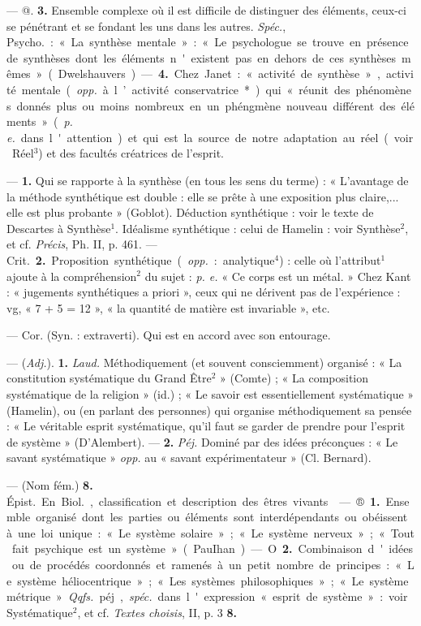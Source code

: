 \begin{itemize}[leftmargin=1cm, label=, itemsep=1pt]
— @. {\bf 3.} Ensemble complexe où il
est difficile de distinguer des éléments, ceux-ci se pénétrant et se
fondant les uns dans les autres.
{\it Spéc.}, \si{Psycho.} : « La synthèse mentale » : « Le psychologue se trouve
en présence de synthèses dont les
éléments n'existent pas en dehors
de ces synthèses mêmes. » (Dwelshauvers). — {\bf 4.} Chez Janet : « activité
de synthèse », activité mentale
({\it opp.} à l’activité conservatrice*) qui
« réunit des phénomènes donnés
plus ou moins nombreux en un phéngmène nouveau différent des éléments » ({\it p. e.} dans l'attention) et qui
est la source de notre adaptation au
réel (voir Réel$^3$) et des facultés créatrices de l'esprit.

 — {\bf 1.} Qui se rapporte à
la synthèse (en tous les sens du
terme) : « L'avantage de la méthode
synthétique est double : elle se
prête à une exposition plus claire,...
elle est plus probante » (Goblot).
Déduction synthétique : voir le texte
de Descartes à Synthèse$^1$. Idéalisme
synthétique : celui de Hamelin : voir
Synthèse$^2$, et cf. {\it Précis}, Ph. II,
p. 461.
— \si{Crit.} {\bf 2.} Proposition synthétique ({\it opp.} : analytique$^4$) : celle où
l’attribut$^1$ ajoute à la compréhension$^2$ du sujet : {\it p. e.} « Ce corps est un
métal. » Chez Kant : « jugements
synthétiques a priori », ceux qui ne
dérivent pas de l'expérience : vg,
« 7 + 5 = 12 », « la quantité de
matière est invariable », etc.

 — Cor. (Syn. : extraverti). Qui
est en accord avec son entourage.

 — ({\it Adj.}). {\bf 1.} {\it Laud.} Méthodiquement (et souvent consciemment) organisé : « La constitution
systématique du Grand Être$^2$ »
(Comte) ; « La composition systématique de la religion » (id.) ; « Le
savoir est essentiellement systématique » (Hamelin), ou (en parlant
des personnes) qui organise méthodiquement sa pensée : « Le véritable
esprit systématique, qu'il faut se
garder de prendre pour l'esprit de
système » (D'Alembert). — {\bf 2.} {\it Péj.}
Dominé par des idées préconçues :
« Le savant systématique » {\it opp.} au
« savant expérimentateur » (Cl. Bernard).

— (Nom fém.) {\bf 8.} \si{Épist.} En \si{Biol.},
classification et description des
êtres vivants.

 — ®. {\bf 1.} Ensemble organisé
dont les parties ou éléments sont
interdépendants ou obéissent à une
loi unique : « Le système solaire »;
« Le système nerveux »; « Tout fait
psychique est un système » (PauIhan). — O. {\bf 2.} Combinaison d'idées
ou de procédés coordonnés et ramenés à un petit nombre de principes :
« Le système héliocentrique »; « Les
systèmes philosophiques »; « Le
système métrique » {\it Qqfs.} péj., {\it spéc.}
dans l'expression « esprit de système » : voir Systématique$^2$, et cf.
{\it Textes choisis}, II, p. 3 {\bf 8.}

	\end{itemize}
